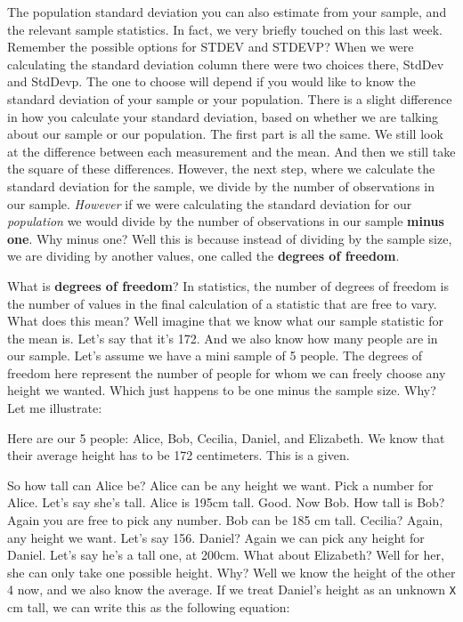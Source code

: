 \documentclass[
]{book}
\begin{document}
The population standard deviation you can also estimate from your sample, and the relevant sample statistics. In fact, we very briefly touched on this last week. Remember the possible options for STDEV and STDEVP? When we were calculating the standard deviation column there were two choices there, StdDev and StdDevp. The one to choose will depend if you would like to know the standard deviation of your sample or your population. There is a slight difference in how you calculate your standard deviation, based on whether we are talking about our sample or our population. The first part is all the same. We still look at the difference between each measurement and the mean. And then we still take the square of these differences. However, the next step, where we calculate the standard deviation for the sample, we divide by the number of observations in our sample. \emph{However} if we were calculating the standard deviation for our \emph{population} we would divide by the number of observations in our sample \textbf{minus one}. Why minus one? Well this is because instead of dividing by the sample size, we are dividing by another values, one called the \textbf{degrees of freedom}.

What is \textbf{degrees of freedom}? In statistics, the number of degrees of freedom is the number of values in the final calculation of a statistic that are free to vary. What does this mean? Well imagine that we know what our sample statistic for the mean is. Let's say that it's 172. And we also know how many people are in our sample. Let's assume we have a mini sample of 5 people. The degrees of freedom here represent the number of people for whom we can freely choose any height we wanted. Which just happens to be one minus the sample size. Why? Let me illustrate:

Here are our 5 people: Alice, Bob, Cecilia, Daniel, and Elizabeth. We know that their average height has to be 172 centimeters. This is a given.

So how tall can Alice be? Alice can be any height we want. Pick a number for Alice. Let's say she's tall. Alice is 195cm tall. Good. Now Bob. How tall is Bob? Again you are free to pick any number. Bob can be 185 cm tall. Cecilia? Again, any height we want. Let's say 156. Daniel? Again we can pick any height for Daniel. Let's say he's a tall one, at 200cm. What about Elizabeth? Well for her, she can only take one possible height. Why? Well we know the height of the other 4 now, and we also know the average. If we treat Daniel's height as an unknown \texttt{X} cm tall, we can write this as the following equation:
\end{document}
